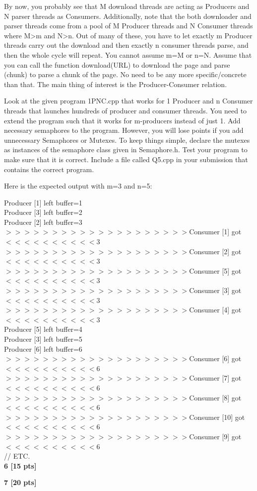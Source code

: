 \documentclass[12pt]{article}
\begin{document}
By now, you probably see that M download threads are acting as Producers and N parser threads as Consumers. Additionally, note that the both downloader and parser threads come from a pool of M Producer threads and N Consumer threads where M>m and N>n. Out of many of these, you have to let exactly m Producer threads carry out the download and then exactly n consumer threads parse, and then the whole cycle will repeat. You cannot assume m=M or n=N. Assume that you can call the function download(URL) to download the page and parse (chunk) to parse a chunk of the page. No need to be any more specific/concrete than that. The main thing of interest is the Producer-Consumer relation.  

Look at the given program 1PNC.cpp that works for 1 Producer and n Consumer threads that launches hundreds of producer and consumer threads. You need to extend the program such that it works for m-producers instead of just 1. Add necessary semaphores to the program. However, you will lose points if you add unnecessary Semaphores or Mutexes. To keep things simple, declare the mutexes as instances of the semaphore class given in  Semaphore.h. Test your program to make sure that it is correct. Include a file called Q5.cpp in your submission that contains the correct program.

Here is the expected output with m=3 and n=5:

\noindent
Producer [1] left buffer=1\\
Producer [3] left buffer=2\\
Producer [2] left buffer=3\\
$>>>>>>>>>>>>>>>>>>>>$Consumer [1] got $<<<<<<<<<<$3\\
$>>>>>>>>>>>>>>>>>>>>$Consumer [2] got $<<<<<<<<<<$3\\
$>>>>>>>>>>>>>>>>>>>>$Consumer [5] got $<<<<<<<<<<$3\\
$>>>>>>>>>>>>>>>>>>>>$Consumer [3] got $<<<<<<<<<<$3\\
$>>>>>>>>>>>>>>>>>>>>$Consumer [4] got $<<<<<<<<<<$3\\
Producer [5] left buffer=4\\
Producer [3] left buffer=5\\
Producer [6] left buffer=6\\
$>>>>>>>>>>>>>>>>>>>>$Consumer [6] got $<<<<<<<<<<$6\\
$>>>>>>>>>>>>>>>>>>>>$Consumer [7] got $<<<<<<<<<<$6\\
$>>>>>>>>>>>>>>>>>>>>$Consumer [8] got $<<<<<<<<<<$6\\
$>>>>>>>>>>>>>>>>>>>>$Consumer [10] got $<<<<<<<<<<$6\\
$>>>>>>>>>>>>>>>>>>>>$Consumer [9] got $<<<<<<<<<<$6\\
// ETC.\\

{\bf 6 [15 pts]}

{\bf 7 [20 pts]}
\end{document}
